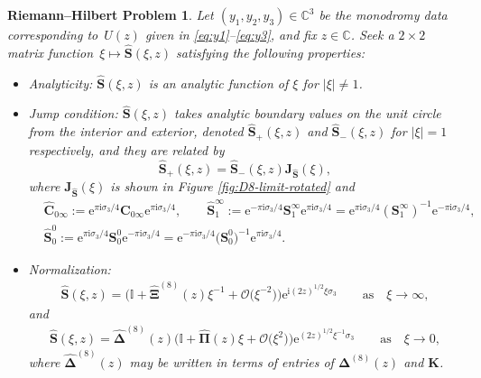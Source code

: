 \documentclass[pdftex]{sigma}
\numberwithin{equation}{section}
\newtheorem{rhp}[Theorem]{Riemann--Hilbert Problem}
\newcommand{\ee}{\mathrm{e}}
\newcommand{\ii}{\mathrm{i}}
\newcommand{\C}{{\mathbb{C}}}
\begin{document}
\begin{rhp}
Let $(y_1,y_2, y_3) \in \C^3$ be the monodromy data corresponding to~$U(z)$ given in \eqref{eq:y1}--\eqref{eq:y3}, and fix $z\in\mathbb{C}$. Seek a $2\times 2$ matrix function~${\xi\mapsto\widehat{\mathbf{S}}(\xi, z)}$ satisfying the following properties:
\begin{itemize}\itemsep=0pt
 \item Analyticity: $\widehat{\mathbf{S}}(\xi, z)$ is an analytic function of $\xi$ for $|\xi|\neq 1$.
 \item Jump condition:
 $\widehat{\mathbf{S}}(\xi, z)$ takes analytic boundary values on the unit circle from the interior and exterior, denoted $\widehat{\mathbf{S}}_+(\xi,z)$ and $\widehat{\mathbf{S}}_-(\xi,z)$ for $|\xi|=1$ respectively, and they are related by
 \begin{equation*}
 \widehat{\mathbf{S}}_+(\xi,z)=\widehat{\mathbf{S}}_-(\xi,z) \mathbf J_{\widehat{\mathbf{S}}}(\xi),
 \end{equation*}
 where $\mathbf J_{\widehat{\mathbf{S}}}(\xi)$ is shown in Figure {\rm\ref{fig:D8-limit-rotated}} and
 \begin{align}
 &\widehat{\mathbf C}_{0\infty} := \ee^{\pi \ii \sigma_3/4} \mathbf C_{0\infty}\ee^{\pi \ii \sigma_3/4}, \qquad
 \widehat{\mathbf S}_1^\infty := \ee^{-\pi \ii \sigma_3/4} {\mathbf S}_1^\infty \ee^{\pi \ii \sigma_3/4} = \ee^{\pi \ii \sigma_3/4} ({\mathbf S}_1^\infty)^{-1} \ee^{-\pi \ii \sigma_3/4}, \nonumber\\
 & \widehat{\mathbf{S}}_0^0:= \ee^{\pi \ii \sigma_3/4} {\mathbf S}_0^0 \ee^{-\pi \ii \sigma_3/4} = \ee^{-\pi \ii \sigma_3/4} \big({\mathbf S}_0^0\big)^{-1} \ee^{\pi \ii \sigma_3/4}. \label{eq:hat-jumps}
 \end{align}
 \item Normalization:
\begin{gather}\label{eq:s-hat-norm-inf}\widehat{\mathbf{S}}(\xi,z) = \big(\mathbb{I} +\widehat{\mathbf{\Xi}}^{(8)}(z)\xi^{-1}+ \mathcal{O}\big(\xi^{-2}\big) \big) \ee^{\ii (2z)^{1/2} \xi \sigma_3 } \qquad \text{as} \quad \xi \to \infty,
\end{gather}
 and
\begin{gather}
\widehat{\mathbf{S}}(\xi,z) = \widehat{\mathbf{\Delta}}^{(8)}(z) \big(\mathbb{I} + \widehat{\mathbf{\Pi}}(z)\xi+\mathcal{O}\big(\xi^2\big) \big) \ee^{ (2z)^{1/2} \xi^{-1} \sigma_3 } \qquad \text{as} \quad \xi \to 0,\label{eq:s-hat-norm-zero}
\end{gather}
 where $\widehat{\mathbf{\Delta}}^{(8)}(z)$ may be written in terms of entries of $\mathbf{\Delta}^{(8)}(z)$ and $\mathbf{K}$.
\end{itemize}
\label{rhp:S-hat}
\end{rhp}
\end{document}
